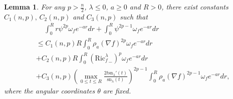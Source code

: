 \documentclass[11pt]{amsart}
\numberwithin{equation}{section}
\newtheorem{lemma}[theorem]{Lemma}
\newcommand{\sn}{\mathrm{sn}}
\begin{document}
\begin{lemma}\label{intesti}
	For any $p>\frac{n}{2}$, $\lambda\leq 0$, $a\geq 0$ and $R>0$, there exist constants $C_1(n,p),\,C_2(n,p)$ and $C_3(n,p)$ such that
	\begin{equation}
		\begin{aligned}
			&\quad\,\int_{0}^Rr\psi^{2p}\omega_fe^{-ar}dr+\int_0^R\psi^{2p-1}\omega_fe^{-ar}dr
			\\&\leq C_1(n,p)R\int_{0}^{R}\rho_a(\nabla f)^{2p}\omega_fe^{-ar}dr\\&+C_2(n,p)R\int_{0}^R\left({\mathrm{Ric}_f^\lambda}_-\right)^{p}\omega_fe^{-ar}dr\\&+C_3(n,p)\left(\max_{0\leq t\leq R}\frac{2t\sn_\lambda'(t)}{\sn_\lambda(t)}\right)^{2p-1}\int_{0}^R\rho_a(\nabla f)^{2p-1}\omega_fe^{-ar}dr,\label{esti1}
		\end{aligned}
	\end{equation}
	where the angular coordinates $\theta$ are fixed.
\end{lemma}
\end{document}
